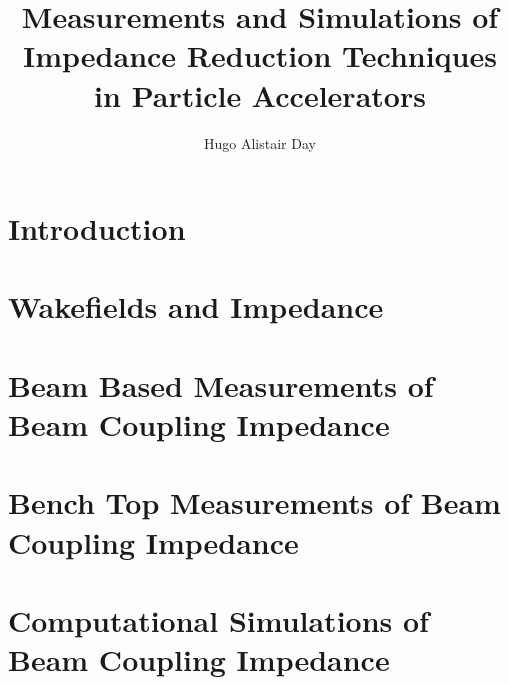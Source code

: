\documentclass[12pt,PhD]{Thesis}
\begin{document}
%
\title{Measurements and Simulations of Impedance Reduction Techniques in Particle Accelerators}
\author{Hugo Alistair Day}


\beforeabstract
{}

\afterabstract
{}

%
\afterpreface


%
%
%



\chapter{Introduction}




\chapter{Wakefields and Impedance}







\chapter{Beam Based Measurements of Beam Coupling Impedance}



\chapter{Bench Top Measurements of Beam Coupling Impedance}



\chapter{Computational Simulations of Beam Coupling Impedance}



\end{document}
